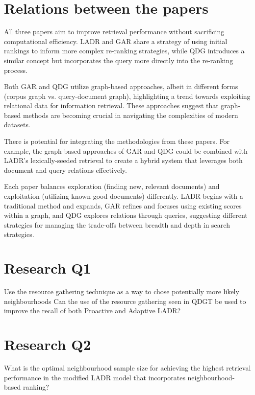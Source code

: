 \documentclass[sigconf,authorversion,nonacm]{acmart}
\begin{document}
\section{Relations between the papers}

All three papers aim to improve retrieval performance without sacrificing computational efficiency.
LADR and GAR share a strategy of using initial rankings to inform more complex re-ranking
strategies, while QDG introduces a similar concept but incorporates the query more directly into the
re-ranking process.

Both GAR and QDG utilize graph-based approaches, albeit in different forms (corpus graph vs.
query-document graph), highlighting a trend towards exploiting relational data for information
retrieval. These approaches suggest that graph-based methods are becoming crucial in navigating the
complexities of modern datasets.

There is potential for integrating the methodologies from these papers. For example, the graph-based
approaches of GAR and QDG could be combined with LADR's lexically-seeded retrieval to create a
hybrid system that leverages both document and query relations effectively.

Each paper balances exploration (finding new, relevant documents) and exploitation (utilizing known
good documents) differently. LADR begins with a traditional method and expands, GAR refines and
focuses using existing scores within a graph, and QDG explores relations through queries, suggesting
different strategies for managing the trade-offs between breadth and depth in search strategies.

\section{Research Q1}

Use the resource gathering technique as a way to chose potentially more likely neighbourhoods
Can the use of the resource gathering seen in QDGT\cite{query-document} be used to improve the recall
of both Proactive and Adaptive LADR?

\section{Research Q2}

What is the optimal neighbourhood sample size for achieving the highest retrieval performance in the
modified LADR model that incorporates neighbourhood-based ranking?
\end{document}
